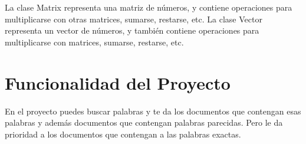 \documentclass{article}
\begin{document}
La clase Matrix representa una matriz de números, y contiene operaciones para multiplicarse con otras matrices, sumarse, restarse, etc. La clase Vector representa un vector de números, y también contiene operaciones para multiplicarse con matrices, sumarse, restarse, etc.

\section{Funcionalidad del Proyecto}
En el proyecto puedes buscar palabras y te da los documentos que contengan esas palabras y además documentos que contengan palabras parecidas. Pero le da prioridad a los documentos que contengan a las palabras exactas.
\end{document}
